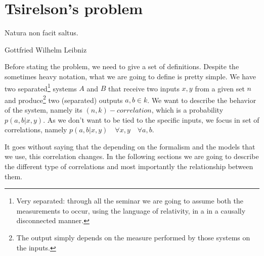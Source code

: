 \section{Tsirelson's problem}
\epigraph{Natura non facit saltus.}{Gottfried Wilhelm Leibniz}

Before stating the problem, we need to give a set of definitions. Despite the sometimes heavy notation, what we are going to define is pretty simple. We have two separated\footnote{Very separated: through all the seminar we are going to assume both the measurements to occur, using the language of relativity, in a in a causally disconnected manner.} systems $A$ and $B$ that receive two inputs $x,y$ from a given set $n$ and produce\footnote{The output simply depends on the measure performed by those systems on the inputs.} two (separated) outputs $a,b \in k$. We want to describe the behavior of the system, namely its $(n,k)-correlation$, which is a probability $p(a,b | x,y)$. As we don't want to be tied to the specific inputs, we focus in set of correlations, namely $p(a,b | x,y) \quad \forall x, y \quad \forall a,b$. 

It goes without saying that the depending on the formalism and the models that we use, this correlation changes. In the following sections we are going to describe the different type of correlations and most importantly the relationship between them.


